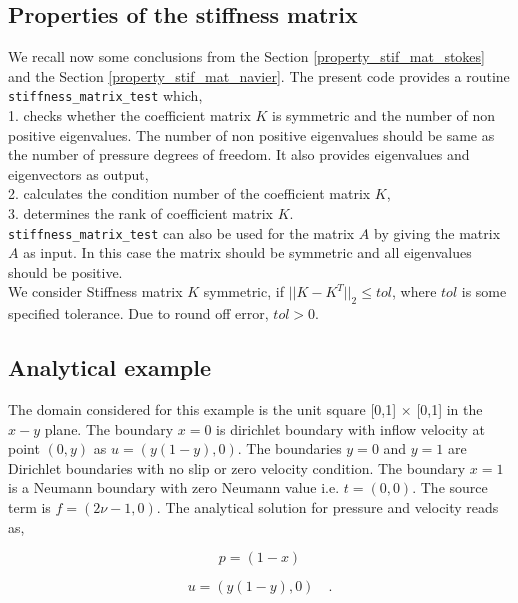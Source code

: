 \documentclass[a4paper]{book}
\begin{document}
\subsection{Properties of the stiffness matrix}

We recall now some conclusions from the Section \ref{property_stif_mat_stokes} and the Section \ref{property_stif_mat_navier}. The present code provides a routine \verb|stiffness_matrix_test| which, \\

1. checks whether the coefficient matrix $K$ is symmetric and the number of non positive eigenvalues. The number of non positive eigenvalues should be same as the number of pressure degrees of freedom. It also provides eigenvalues and eigenvectors as output,\\

2. calculates the condition number of the coefficient matrix $K$, \\

3. determines the rank of coefficient matrix $K$.\\

\verb|stiffness_matrix_test| can also be used for the matrix $A$ by giving the matrix $A$ as input. In this case the matrix should be symmetric and all eigenvalues should be positive.\\

We consider Stiffness matrix $K$ symmetric, if $||K-K^T||_2 \leq tol$, where $tol$ is some specified tolerance. Due to round off error, $tol > 0$.   

\subsection{Analytical example}

The domain considered for this example is the unit square [0,1] $\times$ [0,1] in the $x-y$ plane. 
The boundary ${x=0}$ is dirichlet boundary with inflow velocity at point $(0,y)$ as $u = (y(1-y), 0)$. The boundaries ${y = 0}$ and ${y = 1}$ are Dirichlet boundaries with no slip or zero velocity condition. The boundary ${x = 1}$ is a Neumann boundary with zero Neumann value i.e. $t = (0, 0)$. The source term is $f = (2 \nu - 1, 0)$. The analytical solution for pressure and velocity reads as,

\begin{center}

\begin{equation}
p = (1 - x)
\end{equation}

\begin{equation} 
 u = (y(1-y), 0) \quad \textrm{.}
\end{equation}

\end{center}
\end{document}
